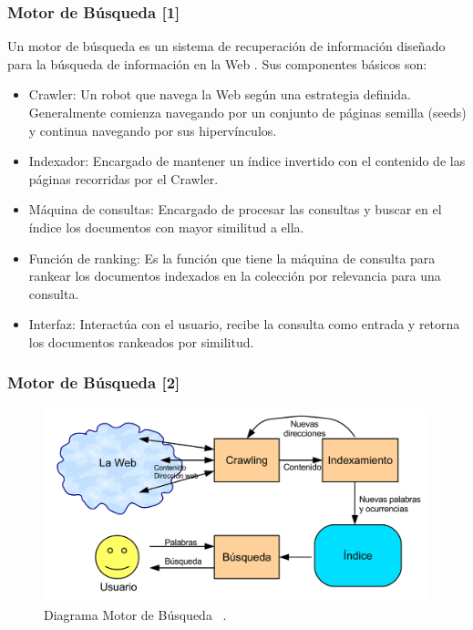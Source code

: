 \documentclass[mathserif]{beamer}
\begin{document}
\begin{frame}\frametitle{Motor de Búsqueda [1]}


{\footnotesize
  Un motor de búsqueda es un sistema de recuperación de información diseñado para la búsqueda de información en la Web \cite{libroweb2008}. Sus componentes básicos son:


\begin{block}


\begin{itemize}
\item Crawler: Un robot que navega  la Web según una estrategia definida. Generalmente comienza navegando por un conjunto de páginas semilla (seeds) y continua navegando por sus hipervínculos.
\item Indexador: Encargado de mantener un índice invertido con el contenido de las páginas recorridas por el Crawler.
\item Máquina de consultas: Encargado de procesar las  consultas y buscar en el índice los documentos  con mayor similitud a ella.
\item Función de ranking: Es la función que tiene la máquina de consulta para rankear los documentos indexados en la colección por relevancia para una consulta.
\item Interfaz: Interactúa con el usuario, recibe la consulta como entrada y retorna los documentos rankeados por similitud.
 
\end{itemize}

\end{block}
}

\end{frame}


\begin{frame}\frametitle{Motor de Búsqueda [2]}

\begin{figure}[h!]
	\centering
	\includegraphics[scale=0.11]{pics/searchengine.png}
	\caption{ Diagrama Motor de Búsqueda ~\cite{libroweb2008}.}
\end{figure}

\end{frame}
\end{document}
